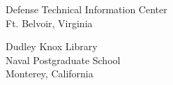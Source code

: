 \documentclass[techreport, article]{npsreport2018}
\begin{document}



%
%



%
%
\NPSend

%
\begin{distributionlist}
\item Defense Technical Information Center\\Ft. Belvoir, Virginia
\item Dudley Knox Library\\Naval Postgraduate School\\Monterey, California
%

\end{distributionlist}
\end{document}
